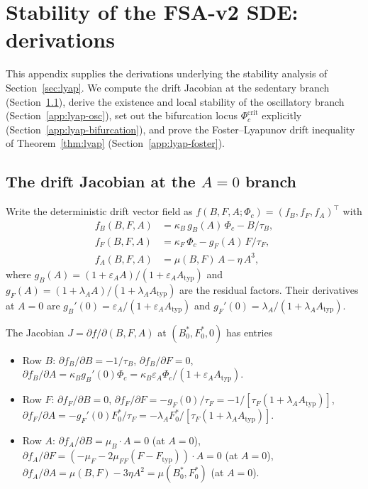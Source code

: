 \section{Stability of the FSA-v2 SDE: derivations}\label{app:lyap}

This appendix supplies the derivations underlying the stability
analysis of Section~\ref{sec:lyap}. We compute the drift Jacobian
at the sedentary branch (Section~\ref{app:lyap-jacobian}), derive
the existence and local stability of the oscillatory branch
(Section~\ref{app:lyap-osc}), set out the bifurcation locus
$\Phi_c^{\mathrm{crit}}$ explicitly
(Section~\ref{app:lyap-bifurcation}), and prove the
Foster--Lyapunov drift inequality of Theorem~\ref{thm:lyap}
(Section~\ref{app:lyap-foster}).

\subsection{The drift Jacobian at the \texorpdfstring{$A=0$}{A=0} branch}\label{app:lyap-jacobian}

Write the deterministic drift vector field as
$f(B,F,A;\Phi_c) = (f_B,f_F,f_A)^{\!\top}$ with
\begin{align*}
  f_B(B,F,A) &= \kappa_B\,g_B(A)\,\Phi_c - B/\tau_B, \\
  f_F(B,F,A) &= \kappa_F\,\Phi_c - g_F(A)\,F/\tau_F, \\
  f_A(B,F,A) &= \mu(B,F)\,A - \eta\,A^3,
\end{align*}
where $g_B(A) = (1+\varepsilon_A A)/(1+\varepsilon_A A_{\mathrm{typ}})$
and $g_F(A) = (1+\lambda_A A)/(1+\lambda_A A_{\mathrm{typ}})$ are
the residual factors. Their derivatives at $A = 0$ are
$g_B'(0) = \varepsilon_A/(1+\varepsilon_A A_{\mathrm{typ}})$ and
$g_F'(0) = \lambda_A/(1+\lambda_A A_{\mathrm{typ}})$.

The Jacobian $J = \partial f/\partial(B,F,A)$ at $(B^*_0,F^*_0,0)$
has entries

\begin{itemize}
  \item Row $B$:
    $\partial f_B/\partial B = -1/\tau_B$,
    $\partial f_B/\partial F = 0$,
    $\partial f_B/\partial A = \kappa_B g_B'(0) \Phi_c
      = \kappa_B \varepsilon_A \Phi_c/(1+\varepsilon_A A_{\mathrm{typ}})$.
  \item Row $F$:
    $\partial f_F/\partial B = 0$,
    $\partial f_F/\partial F = -g_F(0)/\tau_F = -1/[\tau_F(1+\lambda_A A_{\mathrm{typ}})]$,
    $\partial f_F/\partial A = -g_F'(0) F^*_0/\tau_F
      = -\lambda_A F^*_0/[\tau_F(1+\lambda_A A_{\mathrm{typ}})]$.
  \item Row $A$:
    $\partial f_A/\partial B = \mu_B \cdot A = 0$ (at $A=0$),
    $\partial f_A/\partial F = (-\mu_F - 2\mu_{FF}(F-F_{\mathrm{typ}})) \cdot A = 0$ (at $A=0$),
    $\partial f_A/\partial A = \mu(B,F) - 3\eta A^2 = \mu(B^*_0,F^*_0)$ (at $A=0$).
\end{itemize}

